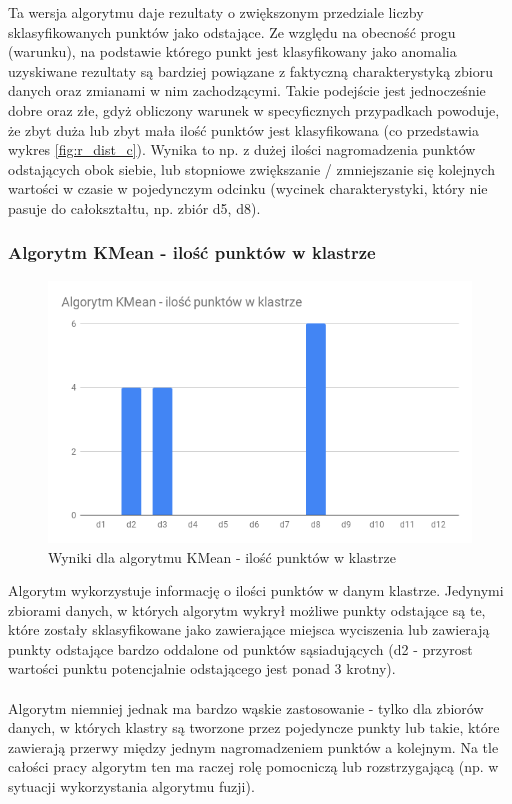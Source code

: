 \documentclass[eng,printmode]{mgr}
\begin{document}
Ta wersja algorytmu daje rezultaty o zwiększonym przedziale liczby sklasyfikowanych punktów jako odstające. Ze względu na obecność progu (warunku), na podstawie którego punkt jest klasyfikowany jako anomalia uzyskiwane rezultaty są bardziej powiązane z faktyczną charakterystyką zbioru danych oraz zmianami w nim zachodzącymi. Takie podejście jest jednocześnie dobre oraz złe, gdyż obliczony warunek w specyficznych przypadkach powoduje, że zbyt duża lub zbyt mała ilość punktów jest klasyfikowana (co przedstawia wykres \ref{fig:r_dist_c}). Wynika to np. z dużej ilości nagromadzenia punktów odstających obok siebie, lub stopniowe zwiększanie / zmniejszanie się kolejnych wartości w czasie w pojedynczym odcinku (wycinek charakterystyki, który nie pasuje do całokształtu, np. zbiór d5, d8).

\subsubsection{Algorytm KMean - ilość punktów w klastrze}
\begin{figure}[H]
  \begin{center}
  \includegraphics[scale=0.7]{r_sim}
  \end{center}
  \caption{Wyniki dla algorytmu KMean - ilość punktów w klastrze}
  \label{fig:r_sim}
\end{figure}
Algorytm wykorzystuje informację o ilości punktów w danym klastrze. Jedynymi zbiorami danych, w których algorytm wykrył możliwe punkty odstające są te, które zostały sklasyfikowane jako zawierające miejsca wyciszenia lub zawierają punkty odstające bardzo oddalone od punktów sąsiadujących (d2 - przyrost wartości punktu potencjalnie odstającego jest ponad 3 krotny).
\\\\
 Algorytm niemniej jednak ma bardzo wąskie zastosowanie - tylko dla zbiorów danych, w których klastry są tworzone przez pojedyncze punkty lub takie, które zawierają przerwy między jednym nagromadzeniem punktów a kolejnym. Na tle całości pracy algorytm ten ma raczej rolę pomocniczą lub rozstrzygającą (np. w sytuacji wykorzystania algorytmu fuzji).
\end{document}

